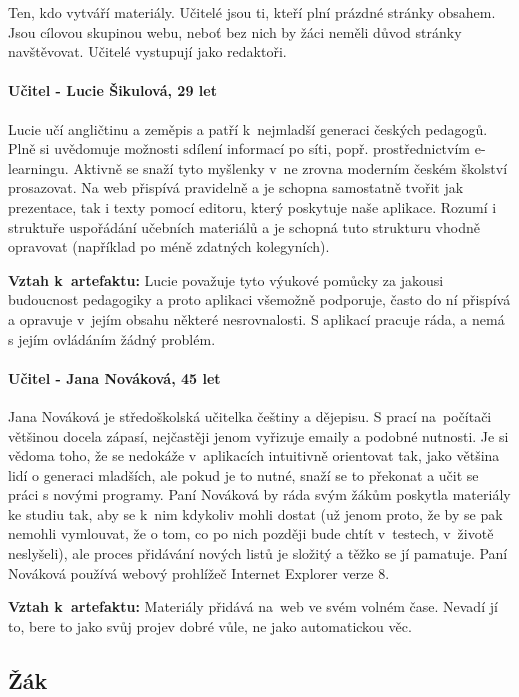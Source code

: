 \documentclass[thesis=B,czech]{FITthesis}[2012/06/26]
\begin{document}
Ten, kdo vytváří materiály. Učitelé jsou ti, kteří plní prázdné stránky obsahem. Jsou cílovou skupinou webu, neboť bez nich by žáci neměli důvod stránky navštěvovat. Učitelé vystupují jako redaktoři.

\paragraph{Učitel - Lucie Šikulová, 29 let}
Lucie učí angličtinu a zeměpis a patří k~nejmladší generaci českých pedagogů. Plně si uvědomuje možnosti sdílení informací po síti, popř. prostřednictvím e-learningu. Aktivně se snaží tyto myšlenky v~ne zrovna moderním českém školství prosazovat. Na web přispívá pravidelně a je schopna samostatně tvořit jak prezentace, tak i texty pomocí editoru, který poskytuje naše aplikace. Rozumí i struktuře uspořádání učebních materiálů a je schopná tuto strukturu vhodně opravovat (například po méně zdatných kolegyních).

\textbf{Vztah k~artefaktu:} Lucie považuje tyto výukové pomůcky za jakousi budoucnost pedagogiky a proto aplikaci všemožně podporuje, často do ní přispívá a opravuje v~jejím obsahu některé nesrovnalosti. S aplikací pracuje ráda, a nemá s jejím ovládáním žádný problém.

\paragraph{Učitel - Jana Nováková, 45 let}
Jana Nováková je středoškolská učitelka češtiny a dějepisu. S prací na~počítači většinou docela zápasí, nejčastěji jenom vyřizuje emaily a podobné nutnosti. Je si vědoma toho, že se nedokáže v~aplikacích intuitivně orientovat tak, jako většina lidí o generaci mladších, ale pokud je to nutné, snaží se to překonat a učit se práci s novými programy. Paní Nováková by ráda svým žákům poskytla materiály ke studiu tak, aby se k~nim kdykoliv mohli dostat (už jenom proto, že by se pak nemohli vymlouvat, že o tom, co po nich později bude chtít v~testech, v~životě neslyšeli), ale proces přidávání nových listů je složitý a těžko se jí pamatuje. Paní Nováková používá webový prohlížeč Internet Explorer verze 8.

\textbf{Vztah k~artefaktu:} Materiály přidává na~web ve svém volném čase. Nevadí jí to, bere to jako svůj projev dobré vůle, ne jako automatickou věc.

\subsection{Žák}
\end{document}
